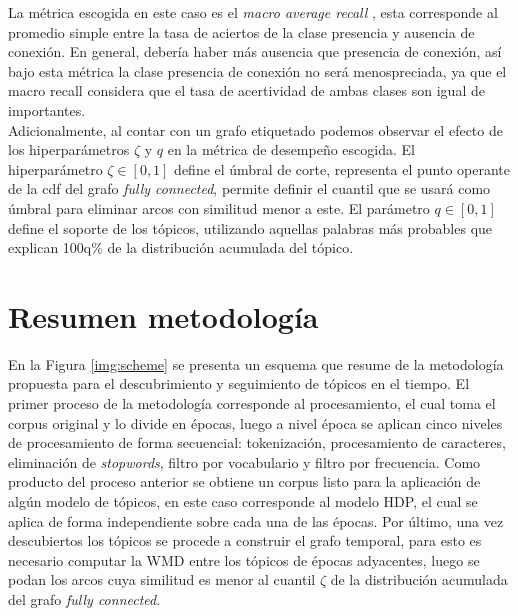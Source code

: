 La métrica escogida en este caso es el \textit{macro average recall} \citep{forman2003extensive}, esta corresponde al promedio simple entre la tasa de aciertos de la clase presencia y ausencia de conexión. En general, debería haber más ausencia que presencia de conexión, así bajo esta métrica la clase presencia de conexión no será menospreciada, ya que el macro recall considera que el tasa de acertividad de ambas clases son igual de importantes.\\

Adicionalmente, al contar con un grafo etiquetado podemos observar el efecto de los hiperparámetros $\zeta$ y $q$ en la métrica de desempeño escogida. El hiperparámetro $\zeta\in[0,1]$ define el úmbral de corte, representa el punto operante de la cdf del grafo \textit{fully connected}, permite definir el cuantil que se usará como úmbral para eliminar arcos con similitud menor a este. El parámetro $q \in [0,1]$ define el soporte de los tópicos, utilizando aquellas palabras más probables que explican 100q\% de la distribución acumulada del tópico. 

\section{Resumen metodología}

En la Figura \ref{img:scheme} se presenta un esquema que resume de la metodología propuesta para el descubrimiento y seguimiento de tópicos en el tiempo. El primer proceso de la metodología corresponde al procesamiento, el cual toma el corpus original y lo divide en épocas, luego a nivel época se aplican cinco niveles de procesamiento de forma secuencial: tokenización, procesamiento de caracteres, eliminación de \textit{stopwords}, filtro por vocabulario y filtro por frecuencia. Como producto del proceso anterior se obtiene un corpus listo para la aplicación de algún modelo de tópicos, en este caso corresponde al modelo HDP, el cual se aplica de forma independiente sobre cada una de las épocas. Por último, una vez descubiertos los tópicos se procede a construir el grafo temporal, para esto es necesario computar la WMD entre los tópicos de épocas adyacentes, luego se podan los arcos cuya similitud es menor al cuantil $\zeta$ de la distribución acumulada del grafo \textit{fully connected}.

\def\db[#1,#2,#3,#4,#5]#6{%
  \node[draw, cylinder, alias=cyl, shape border rotate=90, aspect=#3, %
  minimum height=#1, minimum width=#2, outer sep=-0.5, color=black] (#4) at #5 {};%
  \node at #5 {#6};%
}
\def\boxtext[#1,#2,#3,#4,#5]#6{
        \node[draw=black, rounded corners, minimum height=#1,minimum width=#2, text width=6em] (#4) at #5 {}; 
        \node[anchor=#3,inner sep=4pt,] at (#4.#3)  {#6};
}
\def\isaedge[#1,#2,#3,#4];{ 
  \draw[-triangle 60,color=black!20!black,#4,fill=white] (#1) -- #3
  (#2);  
}

